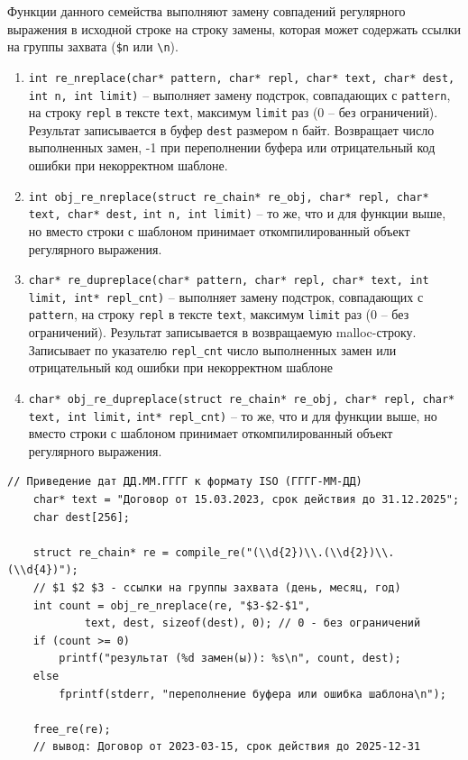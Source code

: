 
Функции данного семейства выполняют замену совпадений регулярного выражения в исходной строке на строку замены, которая может содержать ссылки на группы захвата (\verb`$n` или \verb`\n`).

\begin{enumerate}
	\item \verb`int re_nreplace(char* pattern, char* repl, char* text, char* dest, int n, int limit)` -- выполняет замену подстрок, совпадающих с \verb`pattern`, на строку \verb`repl` в тексте \verb`text`, максимум \verb`limit` раз (0 -- без ограничений). Результат записывается в буфер \verb`dest` размером \verb`n` байт. Возвращает число выполненных замен, -1 при переполнении буфера или отрицательный код ошибки при некорректном шаблоне.
	
	\item \verb`int obj_re_nreplace(struct re_chain* re_obj, char* repl, char* text, char* dest,`
	  \verb`int n, int limit)` -- то же, что и для функции выше, но вместо строки с шаблоном принимает откомпилированный объект регулярного выражения.
	  
	\item \verb`char* re_dupreplace(char* pattern, char* repl, char* text, int limit, int* repl_cnt)` -- выполняет замену подстрок, совпадающих с \verb`pattern`, на строку \verb`repl` в тексте \verb`text`, максимум \verb`limit` раз (0 -- без ограничений). Результат записывается в возвращаемую malloc-строку. Записывает по указателю  \verb`repl_cnt` число выполненных замен или отрицательный код ошибки при некорректном шаблоне
	
	\item \verb`char* obj_re_dupreplace(struct re_chain* re_obj, char* repl, char* text, int limit,`
	  \verb`int* repl_cnt)` -- то же, что и для функции выше, но вместо строки с шаблоном принимает откомпилированный объект регулярного выражения.
\end{enumerate}

\begin{lstlisting}[caption={Замена подстрок с группами захвата}]
	// Приведение дат ДД.ММ.ГГГГ к формату ISO (ГГГГ-ММ-ДД)
	char* text = "Договор от 15.03.2023, срок действия до 31.12.2025";
	char dest[256];
	
	struct re_chain* re = compile_re("(\\d{2})\\.(\\d{2})\\.(\\d{4})");
	// $1 $2 $3 - ссылки на группы захвата (день, месяц, год)
	int count = obj_re_nreplace(re, "$3-$2-$1",
			text, dest, sizeof(dest), 0); // 0 - без ограничений
	if (count >= 0)
		printf("результат (%d замен(ы)): %s\n", count, dest);
	else
		fprintf(stderr, "переполнение буфера или ошибка шаблона\n");
	
	free_re(re);
	// вывод: Договор от 2023-03-15, срок действия до 2025-12-31
\end{lstlisting}

